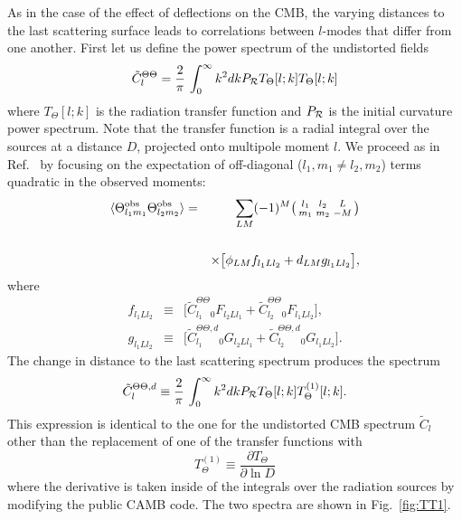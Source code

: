 \documentclass[prl,amsmath,amssymb,floatfix,superscriptaddress,nofootinbib,twocolumn]{revtex4-1}
\def\be{\begin{equation}}
\def\ee{\end{equation}}
\def\bea{\begin{eqnarray}}
\def\eea{\end{eqnarray}}
\newcommand{\vs}{\nonumber\\}
\newcommand{\eql}[1]{\label{eq:#1}}
\newcommand{\rf}[1]{\ref{fig:#1}}
\newcommand{\wh}[1]{{\color{red} #1}}
\begin{document}
As in the case of the effect of deflections on the CMB, the varying distances to the last scattering surface leads to correlations between $l$-modes that differ from one another. 
\wh{First let us define the power spectrum of the undistorted fields
\begin{equation}
\tilde C_l^{\Theta\Theta} =  \frac{2}{\pi}\,\int_0^\infty k^2 dk P_{\cal R} T_\Theta[l;k]
T_\Theta[l;k]
\end{equation}
where $T_\Theta[l;k]$ is the radiation transfer function and $P_{\cal R}$ is the initial
curvature power spectrum.  Note that the transfer function is a radial integral over
the sources at a distance $D$, projected onto multipole moment $l$.
We proceed as in Ref.~\cite{Hu:2001tn} by focusing on the expectation of off-diagonal (${l_1,m_1\ne l_2,m_2}$) terms quadratic in the observed moments:
\bea
\langle \tob_{l_1m_1} \tob_{l_2m_2} \rangle &=& \sum_{LM}  (-1)^M \bigl(\begin{smallmatrix} l_1 & l_2 & L \\ m_1 & m_2 & -M  \end{smallmatrix}\bigr) \nonumber \\
\vs&&\times\big[ \phi_{LM}f_{l_{1}Ll_{2}} + d_{LM}g_{l_{1}Ll_{2}} \big] ,  \eql{quad}
\eea
where
\bea
f_{l_1Ll_2} &\equiv& \big[ \tilde{C}_{l_{1}}^{\Theta\Theta} {}_{0}F_{l_{2}Ll_{1}} +\tilde{C}_{l_{2}}^{\Theta\Theta} {}_{0}F_{l_{1}Ll_{2}}\big],
\vs
g_{l_1Ll_2} &\equiv&\big[ \tilde{C}_{l_{1}}^{\Theta\Theta,d} {}_{0}G_{l_{2}Ll_{1}} +\tilde{C}_{l_{2}}^{\Theta \Theta,d} {}_{0}G_{l_{1}Ll_{2}}\big].\eql{lfg}
\eea
The change in distance to the last scattering spectrum produces the spectrum
\be
\tilde{C}^{\Theta\Theta,d}_{l} \equiv \frac{2}{\pi}\,\int_0^\infty  k^2 dk P_{\cal R} T_\Theta[l;k]
T_\Theta^{(1)}[l;k].
\eql{cld}
\ee
This expression is identical to the one for the undistorted CMB spectrum $\tilde C_l$ other than the replacement of one of the transfer functions with 
\begin{equation}
T_\Theta^{(1)} \equiv \frac{\partial T_\Theta}{\partial \ln D}
\end{equation}
where the derivative is taken inside of the integrals over the radiation sources by modifying
the public CAMB code. 
The two spectra are shown in Fig.~\rf{TT1}. 
}
\end{document}
